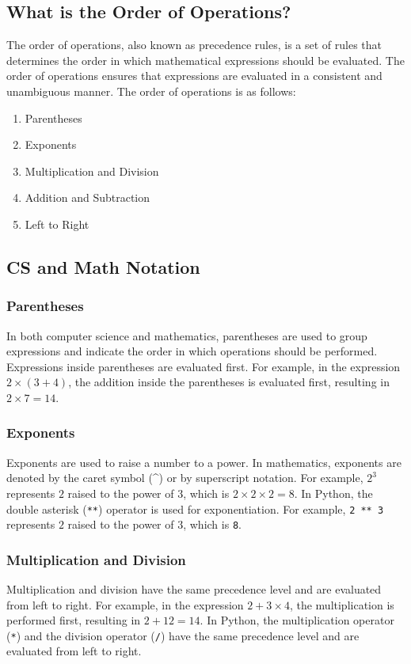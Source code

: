 \subsection{What is the Order of Operations?}
The order of operations, also known as precedence rules, is a set of rules that determines the order in which mathematical expressions should be evaluated. The order of operations ensures that expressions are evaluated in a consistent and unambiguous manner. The order of operations is as follows:

\begin{enumerate}
    \item Parentheses
    \item Exponents
    \item Multiplication and Division
    \item Addition and Subtraction
    \item Left to Right
\end{enumerate}

\subsection{CS and Math Notation}

\subsubsection{Parentheses}
In both computer science and mathematics, parentheses are used to group expressions and indicate the order in which operations should be performed. Expressions inside parentheses are evaluated first. For example, in the expression $2 \times (3 + 4)$, the addition inside the parentheses is evaluated first, resulting in $2 \times 7 = 14$.

\subsubsection{Exponents}
Exponents are used to raise a number to a power. In mathematics, exponents are denoted by the caret symbol (\^{}) or by superscript notation. For example, $2^3$ represents $2$ raised to the power of $3$, which is $2 \times 2 \times 2 = 8$. In Python, the double asterisk (\lstinline|**|) operator is used for exponentiation. For example, \lstinline|2 ** 3| represents $2$ raised to the power of $3$, which is \lstinline|8|.
\subsubsection{Multiplication and Division}
Multiplication and division have the same precedence level and are evaluated from left to right. For example, in the expression $2 + 3 \times 4$, the multiplication is performed first, resulting in $2 + 12 = 14$. In Python, the multiplication operator (\lstinline|*|) and the division operator (\lstinline|/|) have the same precedence level and are evaluated from left to right.
